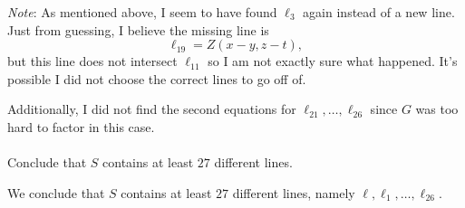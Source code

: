 \documentclass[12pt]{article}
\newlength{\myparskip}
\newenvironment{fullbox}{\begin{lrbox}{\savefullbox}\begin{minipage}{\dimexpr\textwidth-2\fboxsep\relax}\setlength{\parskip}{\myparskip}}{\end{minipage}\end{lrbox}\framebox[\textwidth]{\usebox{\savefullbox}}}
\newenvironment{pbox}[1][]{\begin{fullbox}\ifx#1\empty\else\paragraph{#1}\phantom{}\fi}{\end{fullbox}}
\theoremstyle{definition}
\newcommand{\<}{\langle}
\renewcommand{\>}{\rangle}
\begin{document}
\textit{Note}: As mentioned above, I seem to have found $\ell_3$ again instead of a new line.
Just from guessing, I believe the missing line is
\[
    \ell_{19} = Z(x - y, z - t),
\]
but this line does not intersect $\ell_{11}$ so I am not exactly sure what happened.
It's possible I did not choose the correct lines to go off of.

Additionally, I did not find the second equations for $\ell_{21}, \dots, \ell_{26}$ since $G$ was too hard to factor in this case.

\begin{pbox}
    Conclude that $S$ contains at least $27$ different lines.
\end{pbox}

We conclude that $S$ contains at least $27$ different lines, namely $\ell, \ell_1, \dots, \ell_{26}$.
\end{document}
